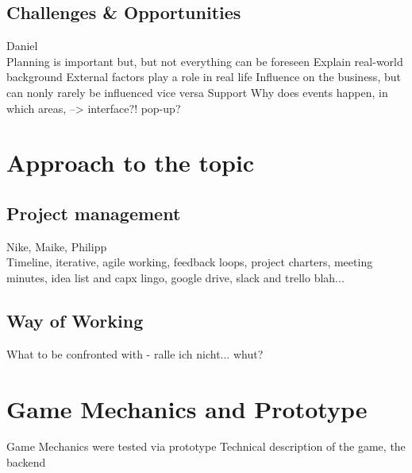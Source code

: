 \documentclass[11pt,titlepage,oneside,openany]{book}
\begin{document}
\section{Challenges \& Opportunities}
Daniel \\
Planning is important but, but not everything can be foreseen 
Explain real-world background
External factors play a role in real life
Influence on the business, but can nonly rarely be influenced vice versa
Support
Why does events happen, in which areas, --> interface?! pop-up?

\label{sec:evil}

\chapter{Approach to the topic}
\section{Project management}
Nike, Maike, Philipp \\
Timeline, iterative, agile working, feedback loops, project charters, meeting minutes, idea list and capx lingo, google drive, slack and trello blah... 
\section{Way of Working}
What to be confronted with - ralle ich nicht... whut?

\chapter{Game Mechanics and Prototype}
\label{cha:alg}
Game Mechanics were tested via prototype
Technical description of the game, the backend








\end{document}
